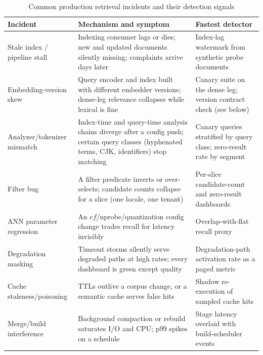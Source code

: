\begin{table}[H]
\centering
\small
\caption{Common production retrieval incidents and their detection signals}
\label{sr:tab:incident_taxonomy}
\begin{tabularx}{\textwidth}{lXX}
\toprule
\textbf{Incident} & \textbf{Mechanism and symptom} & \textbf{Fastest detector} \\
\midrule
Stale index / pipeline stall & Indexing consumer lags or dies; new and updated documents silently missing; complaints arrive days later & Index-lag watermark from synthetic probe documents \\
Embedding-version skew & Query encoder and index built with different embedder versions; dense-leg relevance collapses while lexical is fine & Canary suite on the dense leg; version contract check (see below) \\
Analyzer/tokenizer mismatch & Index-time and query-time analysis chains diverge after a config push; certain query classes (hyphenated terms, CJK, identifiers) stop matching & Canary queries stratified by query class; zero-result rate by segment \\
Filter bug & A filter predicate inverts or over-selects; candidate counts collapse for a slice (one locale, one tenant) & Per-slice candidate-count and zero-result dashboards \\
ANN parameter regression & An $ef$/nprobe/quantization config change trades recall for latency invisibly & Overlap-with-flat recall proxy \\
Degradation masking & Timeout storms silently serve degraded paths at high rates; every dashboard is green except quality & Degradation-path activation rate as a paged metric \\
Cache staleness/poisoning & TTLs outlive a corpus change, or a semantic cache serves false hits & Shadow re-execution of sampled cache hits \\
Merge/build interference & Background compaction or rebuild saturates I/O and CPU; p99 spikes on a schedule & Stage latency overlaid with build-scheduler events \\
\bottomrule
\end{tabularx}
\end{table}

